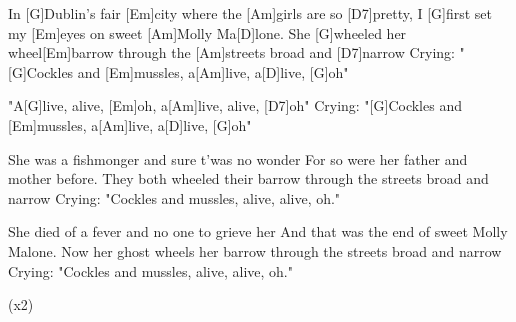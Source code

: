 

\begin{guitar}
	In [G]Dublin's fair [Em]city where the [Am]girls are so [D7]pretty,
	I [G]first set my [Em]eyes on sweet [Am]Molly Ma[D]lone.
	She [G]wheeled her wheel[Em]barrow through the [Am]streets broad and [D7]narrow
	Crying: "[G]Cockles and [Em]mussles, a[Am]live, a[D]live, [G]oh"
	
	"A[G]live, alive, [Em]oh, a[Am]live, alive, [D7]oh"
	Crying: "[G]Cockles and [Em]mussles, a[Am]live, a[D]live, [G]oh"
	
	She was a fishmonger and sure t'was no wonder
	For so were her father and mother before.
	They both wheeled their barrow through the streets broad and narrow
	Crying: "Cockles and mussles, alive, alive, oh."
	
	 
	
	She died of a fever and no one to grieve her
	And that was the end of sweet Molly Malone.
	Now her ghost wheels her barrow through the streets broad and narrow
	Crying: "Cockles and mussles, alive, alive, oh."
	
	  (x2)
\end{guitar}

\vspace{-1.5em}



